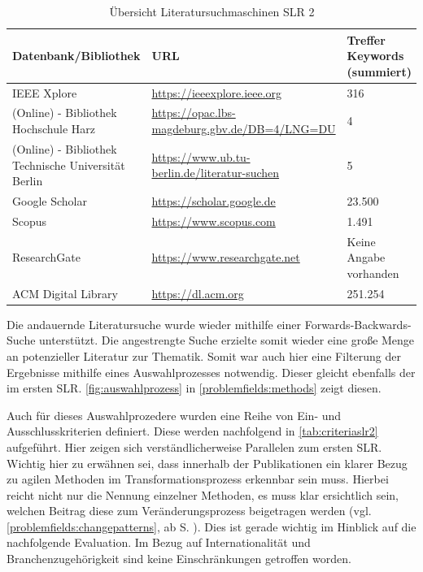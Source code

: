 \begin{table}[ht]
	\centering
	\small
	\caption{Übersicht Literatursuchmaschinen SLR 2}
	\begin{tabular}{|p{5cm}|p{7cm}||p{3cm}|}
		\hline
		\textbf{Datenbank/Bibliothek}& \textbf{URL} &  \textbf{Treffer Keywords  (summiert)} \\
		\hline
		IEEE Xplore & \url{https://ieeexplore.ieee.org} & 316 \\
		(Online) - Bibliothek Hochschule Harz & \url{https://opac.lbs-magdeburg.gbv.de/DB=4/LNG=DU} & 4 \\
		(Online) - Bibliothek Technische Universität Berlin  & \url{https://www.ub.tu-berlin.de/literatur-suchen}& 5 \\
		Google Scholar &  \url{https://scholar.google.de}  & 23.500 \\
		Scopus & \url{https://www.scopus.com} & 1.491 \\
		ResearchGate & \url{https://www.researchgate.net} &Keine Angabe vorhanden \\ 
		ACM Digital Library & \url{https://dl.acm.org} & 251.254 \\
		\hline
	\end{tabular}
	\label{tab:suchmaschinenslr2}
\end{table}

Die andauernde Literatursuche wurde wieder mithilfe einer Forwards-Backwards-Suche unterstützt. Die angestrengte Suche erzielte somit wieder eine große Menge an potenzieller Literatur zur Thematik. Somit war auch hier eine Filterung der Ergebnisse mithilfe eines Auswahlprozesses notwendig. Dieser gleicht ebenfalls der im ersten SLR. \ref{fig:auswahlprozess} in \ref{problemfields:methods} zeigt diesen. 

Auch für dieses Auswahlprozedere wurden eine Reihe von Ein- und Ausschlusskriterien definiert. Diese werden nachfolgend in \ref{tab:criteriaslr2} aufgeführt. Hier zeigen sich verständlicherweise Parallelen zum ersten SLR. Wichtig hier zu erwähnen sei, dass innerhalb der Publikationen ein klarer Bezug zu agilen Methoden im Transformationsprozess erkennbar sein muss. Hierbei reicht nicht nur die Nennung einzelner Methoden, es muss klar ersichtlich sein, welchen Beitrag diese zum Veränderungsprozess beigetragen werden (vgl. \ref{problemfields:changepatterns}, ab S. \pageref{problemfields:changepatterns}). Dies ist gerade wichtig im Hinblick auf die nachfolgende Evaluation. Im Bezug auf Internationalität und Branchenzugehörigkeit sind keine Einschränkungen getroffen worden.

